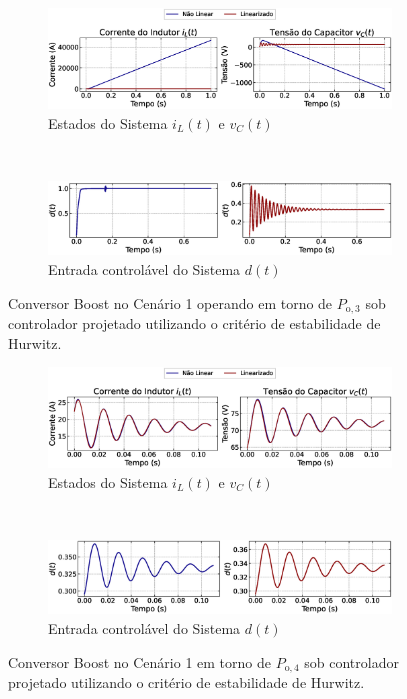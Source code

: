 \begin{figure}[H]
  \centering
  \captionsetup{justification=centering}
  \begin{subfigure}{1.\textwidth}
    \centering
    \includegraphics[width=1.\textwidth]{figuras/classic/boost/sim1/op1/result.eps}
    \caption{Estados do Sistema $i_L(t)$  e $v_C(t)$}
  \end{subfigure}
  \\[6pt]
  \begin{subfigure}{1.\textwidth}
    \centering
    \includegraphics[width=1.\textwidth]{figuras/classic/boost/sim1/op1/duty-cycle.eps}
    \caption{Entrada controlável do Sistema $d(t)$}
  \end{subfigure}
  \caption{Conversor Boost no Cenário 1 operando em torno de $P_{\mathrm{o}, 3}$ sob controlador projetado utilizando o critério de estabilidade de Hurwitz.}
  \label{fig:classic_boost_cen1_op1}
  \begin{subfigure}{1.\textwidth}
    \centering
    \includegraphics[width=1.\textwidth]{figuras/classic/boost/sim1/op2/result.eps}
    \caption{Estados do Sistema $i_L(t)$  e $v_C(t)$}
  \end{subfigure}
  \\[6pt]
  \begin{subfigure}{1.\textwidth}
    \centering
    \includegraphics[width=1.\textwidth]{figuras/classic/boost/sim1/op2/duty-cycle.eps}
    \caption{Entrada controlável do Sistema $d(t)$}
  \end{subfigure}
  \caption{Conversor Boost no Cenário 1 em torno de $P_{\mathrm{o}, 4}$ sob controlador projetado utilizando o critério de estabilidade de Hurwitz.}
  \label{fig:classic_boost_cen1_op2}
\end{figure}

